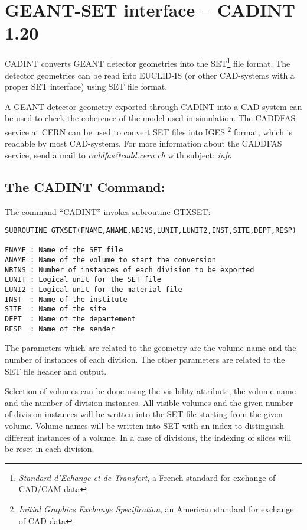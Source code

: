 \normalsize{
 
\quad
\vspace{2cm}
 
\section*{GEANT-SET interface -- CADINT 1.20}
 
CADINT converts GEANT detector geometries into the SET\footnote{{\it Standard
d'Echange et de Transfert}, a French standard for exchange of CAD/CAM data}
file format.
The detector geometries can be read into
EUCLID-IS (or other CAD-systems with a proper
SET interface) using SET file format.
 
A GEANT detector geometry exported through CADINT
into a CAD-system can be used to
check the coherence of the model used in simulation.
The CADDFAS service at CERN can be used to convert SET files into IGES
\footnote{{\it Initial Graphics Exchange Specification}, an American
standard for exchange of CAD-data} format, which is readable
by most CAD-systems.
For more information about the CADDFAS service, send a mail to {\it
caddfas@cadd.cern.ch} with subject: {\it info}
 
 
\subsection*{The CADINT Command:}
 
The command ``CADINT'' invokes subroutine GTXSET:
 
 
\begin{verbatim}
SUBROUTINE GTXSET(FNAME,ANAME,NBINS,LUNIT,LUNIT2,INST,SITE,DEPT,RESP)
 
FNAME : Name of the SET file
ANAME : Name of the volume to start the conversion
NBINS : Number of instances of each division to be exported
LUNIT : Logical unit for the SET file
LUNI2 : Logical unit for the material file
INST  : Name of the institute
SITE  : Name of the site
DEPT  : Name of the departement
RESP  : Name of the sender
\end{verbatim}
 
The parameters which are related to the geometry are the volume name and the
number of instances of each division. The
other parameters are related to the SET file header and output.
 
 
Selection of volumes can be done using the visibility
attribute, the volume name and the number of
division instances.
All visible volumes and the given number of division instances
will be written into the SET file starting from the given volume.
Volume names will
be written into SET with an index to distinguish different instances
of a volume. In a case of divisions, the indexing of slices will
be reset in each division.
 
}
